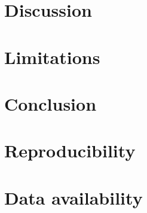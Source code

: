\documentclass[11pt]{article}
\begin{document}
\section{Discussion}

\section{Limitations}

\section{Conclusion}

\section*{Reproducibility}

\section*{Data availability}


% 
\end{document}
